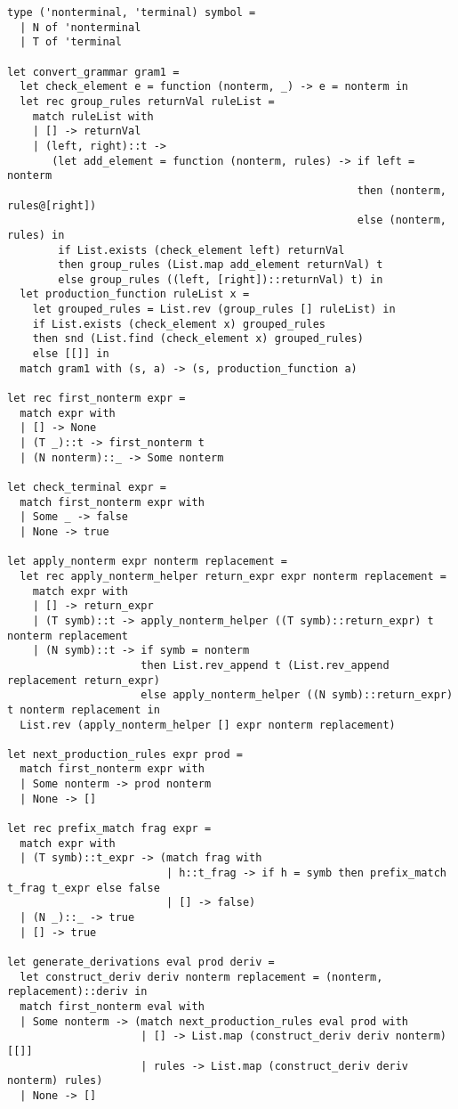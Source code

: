 \documentclass[8pt]{article}
\begin{document}
\begin{verbatim}
type ('nonterminal, 'terminal) symbol =
  | N of 'nonterminal
  | T of 'terminal

let convert_grammar gram1 =
  let check_element e = function (nonterm, _) -> e = nonterm in
  let rec group_rules returnVal ruleList =
    match ruleList with
    | [] -> returnVal
    | (left, right)::t ->
       (let add_element = function (nonterm, rules) -> if left = nonterm
                                                       then (nonterm, rules@[right])
                                                       else (nonterm, rules) in
        if List.exists (check_element left) returnVal
        then group_rules (List.map add_element returnVal) t
        else group_rules ((left, [right])::returnVal) t) in
  let production_function ruleList x =
    let grouped_rules = List.rev (group_rules [] ruleList) in
    if List.exists (check_element x) grouped_rules
    then snd (List.find (check_element x) grouped_rules)
    else [[]] in
  match gram1 with (s, a) -> (s, production_function a)

let rec first_nonterm expr =
  match expr with
  | [] -> None
  | (T _)::t -> first_nonterm t
  | (N nonterm)::_ -> Some nonterm

let check_terminal expr =
  match first_nonterm expr with
  | Some _ -> false
  | None -> true

let apply_nonterm expr nonterm replacement =
  let rec apply_nonterm_helper return_expr expr nonterm replacement =
    match expr with
    | [] -> return_expr
    | (T symb)::t -> apply_nonterm_helper ((T symb)::return_expr) t nonterm replacement
    | (N symb)::t -> if symb = nonterm
                     then List.rev_append t (List.rev_append replacement return_expr)
                     else apply_nonterm_helper ((N symb)::return_expr) t nonterm replacement in
  List.rev (apply_nonterm_helper [] expr nonterm replacement)

let next_production_rules expr prod =
  match first_nonterm expr with
  | Some nonterm -> prod nonterm
  | None -> []

let rec prefix_match frag expr =
  match expr with
  | (T symb)::t_expr -> (match frag with
                         | h::t_frag -> if h = symb then prefix_match t_frag t_expr else false
                         | [] -> false)
  | (N _)::_ -> true
  | [] -> true

let generate_derivations eval prod deriv =
  let construct_deriv deriv nonterm replacement = (nonterm, replacement)::deriv in
  match first_nonterm eval with
  | Some nonterm -> (match next_production_rules eval prod with
                     | [] -> List.map (construct_deriv deriv nonterm) [[]]
                     | rules -> List.map (construct_deriv deriv nonterm) rules)
  | None -> []


\end{verbatim}
\end{document}
